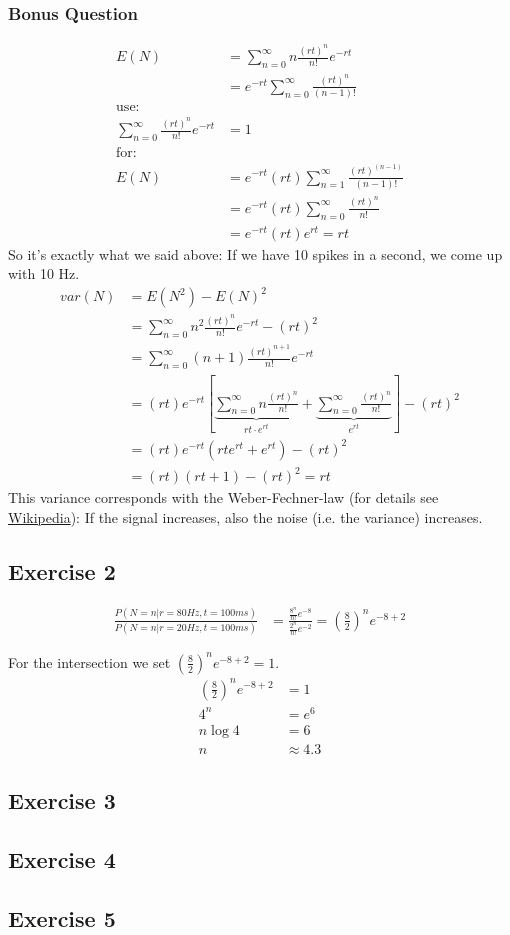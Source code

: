 \documentclass[../main/Notes.tex]{subfiles}
\begin{document}
\subsubsection*{Bonus Question}
\begin{align*}
E(N) &= \sum_{n=0}^\infty{n \frac{(rt)^n}{n!} e^{-rt}} \\
     &= e^{-rt} \sum_{n=0}^\infty{\frac{(rt)^n}{(n-1)!}} \\
\text{use:}&\\
\sum_{n=0}^\infty{\frac{(rt)^n}{n!} e^{-rt}} &= 1 \\
\text{for:}&\\
E(N) &= e^{-rt} (rt) \sum_{n=1}^\infty{\frac{(rt)^{(n-1)}}{(n-1)!}} \\
     &= e^{-rt} (rt) \sum_{n=0}^\infty{\frac{(rt)^{n}}{n!}} \\
     &= e^{-rt} (rt) e^{rt} = rt
\end{align*}
So it's exactly what we said above: If we have 10 spikes in a second, we come up with 10 Hz.
\begin{align*}
var(N) &= E(N^2)-E(N)^2 \\
       &= \sum_{n=0}^\infty{n^2 \frac{(rt)^n}{n!} e^{-rt}} - (rt)^2 \\
       &= \sum_{n=0}^\infty{(n+1) \frac{(rt)^{n+1}}{n!} e^{-rt}} \\
       &= (rt)e^{-rt}\left[ \underbrace{ \sum_{n=0}^\infty{n \frac{(rt)^n}{n!}} }_{rt\cdot e^{rt}} +  \underbrace{ \sum_{n=0}^\infty{\frac{(rt)^n}{n!}} }_{e^{rt}} \right] - (rt)^2 \\
       &= (rt)e^{-rt}\left(rt e^{rt}+e^{rt}\right) - (rt)^2 \\
       &= (rt)(rt+1)-(rt)^2 = rt
\end{align*}
This variance corresponds with the Weber-Fechner-law (for details see \href{http://en.wikipedia.org/wiki/Weber-Fechner_law}{Wikipedia}): If the signal increases, also the noise (i.e. the variance) increases.

\subsection*{Exercise 2}
\begin{align*}
\frac{P(N=n|r=80 Hz, t = 100 ms)}{P(N=n|r=20 Hz, t = 100 ms)} &= \frac{ \frac{8^n}{n!}e^{-8} }{ \frac{2^n}{n!} e^{-2} } = \left(\frac{8}{2}\right)^n e^{-8+2}
\end{align*}

For the intersection we set $\left(\frac{8}{2}\right)^n e^{-8+2} = 1$.
\begin{align*}
\left(\frac{8}{2}\right)^n e^{-8+2} &= 1\\
4^n &= e^6 \\
n \log 4 &= 6 \\
n &\approx 4.3
\end{align*}

\subsection*{Exercise 3}


\subsection*{Exercise 4}


\subsection*{Exercise 5}
\end{document}

